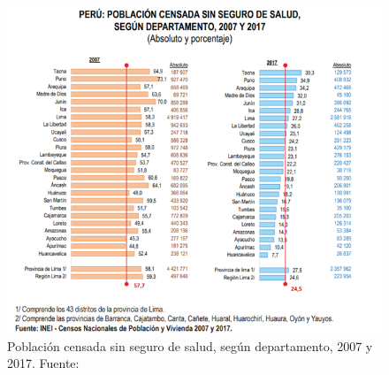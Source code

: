 \begin{figure}[ht]
	\centering
	\includegraphics[width=1.1\textwidth]{1/figures/SINSEGURO.png}
	\caption{Población censada sin seguro de salud, según departamento, 2007 y 2017. Fuente: \cite{inei2018poblacion}}
	\label{7:fig}
\end{figure}

